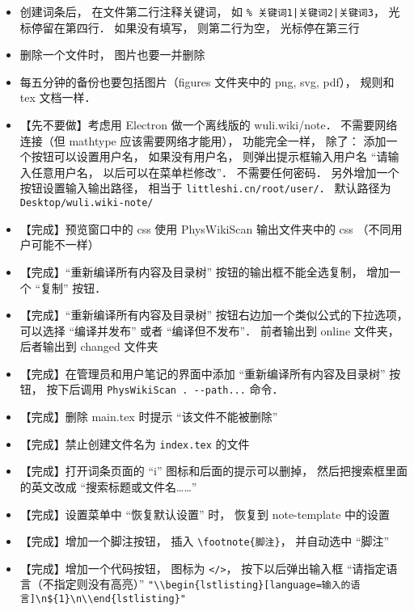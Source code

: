 \begin{itemize}
\item 创建词条后， 在文件第二行注释关键词， 如 \lstinline+% 关键词1|关键词2|关键词3+， 光标停留在第四行． 如果没有填写， 则第二行为空， 光标停在第三行

\item 删除一个文件时， 图片也要一并删除

\item 每五分钟的备份也要包括图片（figures 文件夹中的 png, svg, pdf）， 规则和 tex 文档一样．

\item 【先不要做】考虑用 Electron 做一个离线版的 wuli.wiki/note． 不需要网络连接（但 mathtype 应该需要网络才能用）， 功能完全一样， 除了： 添加一个按钮可以设置用户名， 如果没有用户名， 则弹出提示框输入用户名 “请输入任意用户名， 以后可以在菜单栏修改”． 不需要任何密码． 另外增加一个按钮设置输入输出路径， 相当于 \verb|littleshi.cn/root/user/|． 默认路径为 \verb|Desktop/wuli.wiki-note/|

\item 【完成】预览窗口中的 css 使用 PhysWikiScan 输出文件夹中的 css （不同用户可能不一样）

\item 【完成】“重新编译所有内容及目录树” 按钮的输出框不能全选复制， 增加一个 “复制” 按钮．

\item 【完成】“重新编译所有内容及目录树” 按钮右边加一个类似公式的下拉选项， 可以选择 “编译并发布” 或者 “编译但不发布”． 前者输出到 online 文件夹， 后者输出到 changed 文件夹

\item 【完成】在管理员和用户笔记的界面中添加 “重新编译所有内容及目录树” 按钮， 按下后调用 \lstinline|PhysWikiScan . --path...|  命令．

\item 【完成】删除 main.tex 时提示 “该文件不能被删除”

\item 【完成】禁止创建文件名为 \lstinline|index.tex| 的文件

\item 【完成】打开词条页面的 “i” 图标和后面的提示可以删掉， 然后把搜索框里面的英文改成 “搜索标题或文件名……”

\item 【完成】设置菜单中 “恢复默认设置” 时， 恢复到 note-template 中的设置

\item 【完成】增加一个脚注按钮， 插入 \lstinline|\footnote{脚注}|， 并自动选中 “脚注”

\item 【完成】增加一个代码按钮， 图标为 \lstinline|</>|， 按下以后弹出输入框 “请指定语言（不指定则没有高亮）” \lstinline|"\\begin{lstlisting}[language=输入的语言]\n${1}\n\\end{lstlisting}"|


\end{itemize}
